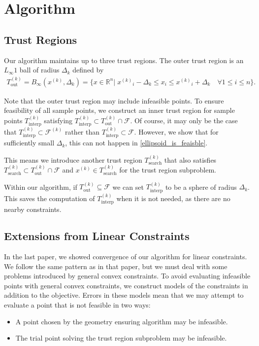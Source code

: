 \documentclass{article}
\theoremstyle{case}
\numberwithin{theorem}{subsection}
\newcommand{\dk}{\Delta_k}
\newcommand{\feasiblek}{{\mathcal F^{(k)}}}
\newcommand{\feasible}{{\mathcal F}}
\newcommand{\outertrk}{{T_{\text{out}}^{(k)}}}
\newcommand{\Rn}{\mathbb R^n}
\newcommand{\sampletrk}{{T_{\text{interp}}^{(k)}}}
\newcommand{\searchtrk}{{T_{\text{search}}^{(k)}}}
\newcommand{\tr}{{ B_{\infty}\left(\xk, \dk\right) }}
\newcommand{\xk}{{x^{(k)}}}
\begin{document}
\section{Algorithm}

\subsection{Trust Regions}
Our algorithm maintains up to three trust regions.
The outer trust region is an $L_{\infty}1$ ball of radius $ \dk $ defined by
\begin{align}
\outertrk = \tr = \{x\in \Rn | \; {\xk}_i - \dk \le x_i \le {\xk}_i + \dk \quad \forall 1\le i \le n\}. \label{define_outer_trust_region}
\end{align}

Note that the outer trust region may include infeasible points.
To ensure feasibility of all sample points, we construct an inner trust region for sample points $ \sampletrk $  satisfying 
$\sampletrk \subset \outertrk \cap \feasible$.
Of course, it may only be the case that $\sampletrk \subset \feasiblek$ rather than $\sampletrk \subset \feasible$.
However, we show that for sufficiently small $\dk$, this can not happen in \cref{ellipsoid_is_feaisble}.

This means we introduce another trust region $ \searchtrk $ that also satisfies 
$ \searchtrk \subset \outertrk \cap \feasible$ and $\xk \in \searchtrk $ for the trust region subproblem.


Within our algorithm, if $ \outertrk \subseteq \feasible$ we can set $ \sampletrk $ to be a sphere of radius $\dk$.
This saves the computation of $ \sampletrk $ when it is not needed, as there are no nearby constraints.

\subsection{Extensions from Linear Constraints}
In the last paper, we showed convergence of our algorithm for linear constraints.
We follow the same pattern as in that paper, but we must deal with some problems introduced by general convex constraints.
To avoid evaluating infeasible points with general convex constraints, we construct models of the constraints in addition to the objective.
Errors in these models mean that we may attempt to evaluate a point that is not feasible in two ways:
\begin{itemize}
\item A point chosen by the geometry ensuring algorithm may be infeasible.
\item The trial point solving the trust region subproblem may be infeasible.
\end{itemize}
\end{document}
